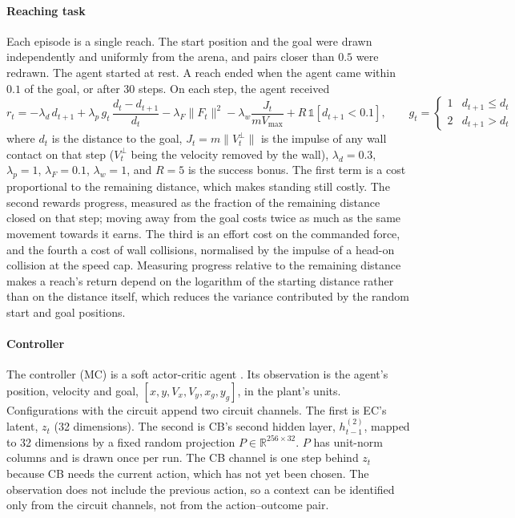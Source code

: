 \paragraph{Reaching task}
Each episode is a single reach. The start position and the goal were drawn independently and uniformly from the arena, and pairs closer than $0.5$ were redrawn. The agent started at rest. A reach ended when the agent came within $0.1$ of the goal, or after 30 steps. On each step, the agent received
\begin{equation}
    r_t = -\lambda_d \, d_{t+1}
    + \lambda_p \, g_t \, \frac{d_t - d_{t+1}}{d_t}
    - \lambda_F \lVert F_t \rVert^2
    - \lambda_w \frac{J_t}{m V_{\max}}
    + R \, \mathbb{1}\!\left[ d_{t+1} < 0.1 \right],
    \qquad
    g_t = \begin{cases} 1 & d_{t+1} \le d_t \\ 2 & d_{t+1} > d_t \end{cases}
\end{equation}
where $d_t$ is the distance to the goal, $J_t = m \lVert V^{\perp}_t \rVert$ is the impulse of any wall contact on that step ($V^{\perp}_t$ being the velocity removed by the wall), $\lambda_d = 0.3$, $\lambda_p = 1$, $\lambda_F = 0.1$, $\lambda_w = 1$, and $R = 5$ is the success bonus. The first term is a cost proportional to the remaining distance, which makes standing still costly. The second rewards progress, measured as the fraction of the remaining distance closed on that step; moving away from the goal costs twice as much as the same movement towards it earns. The third is an effort cost on the commanded force, and the fourth a cost of wall collisions, normalised by the impulse of a head-on collision at the speed cap. Measuring progress relative to the remaining distance makes a reach's return depend on the logarithm of the starting distance rather than on the distance itself, which reduces the variance contributed by the random start and goal positions.

\paragraph{Controller}
The controller (MC) is a soft actor-critic agent \citep{haarnoja2018soft}. Its observation is the agent's position, velocity and goal, $[x, y, V_x, V_y, x_g, y_g]$, in the plant's units. Configurations with the circuit append two circuit channels. The first is EC's latent, $z_t$ (32 dimensions). The second is CB's second hidden layer, $h^{(2)}_{t-1}$, mapped to 32 dimensions by a fixed random projection $P \in \mathbb{R}^{256 \times 32}$. $P$ has unit-norm columns and is drawn once per run. The CB channel is one step behind $z_t$ because CB needs the current action, which has not yet been chosen. The observation does not include the previous action, so a context can be identified only from the circuit channels, not from the action--outcome pair.


